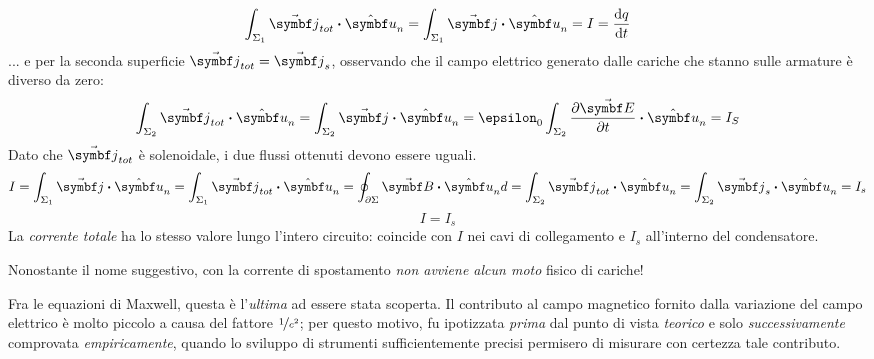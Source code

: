 \begin{equation*}
	\int_{\Sigma_1}\vba{j}_{tot}\vdot\vbh{u}_n=\int_{\Sigma_1}\vba{j}\vdot\vbh{u}_n=I=\dv{q}{t}
\end{equation*}
... e per la seconda superficie $\vba{j}_{tot}=\vba{j}_s$, osservando che il campo elettrico generato dalle cariche che stanno sulle armature è diverso da zero:
\begin{equation*}
	\int_{\Sigma_2}\vba{j}_{tot}\vdot\vbh{u}_n=\int_{\Sigma_2}\vba{j}\vdot\vbh{u}_n=\epsilon_0\int_{\Sigma_2}\pdv{\vba{E}}{t}\vdot\vbh{u}_n=I_S
\end{equation*}
Dato che $\vba{j}_{tot}$ è solenoidale, i due flussi ottenuti devono essere uguali.
\begin{equation*}
	I=\int_{\Sigma_1}\vba{j}\vdot\vbh{u}_n=\int_{\Sigma_1}\vba{j}_{tot}\vdot\vbh{u}_n=\oint_{\partial \Sigma}\vba{B}\vdot\vbh{u}_nd=\int_{\Sigma_2}\vba{j}_{tot}\vdot\vbh{u}_n=\int_{\Sigma_2}\vba{j}_{s}\vdot\vbh{u}_n=I_s
\end{equation*}
\begin{equation}
	I=I_s
\end{equation}
La \textit{corrente totale} ha lo stesso valore lungo l'intero circuito: coincide con $I$ nei cavi di collegamento e $I_s$ all'interno del condensatore.
\begin{attention}
	Nonostante il nome suggestivo, con la corrente di spostamento \textit{non avviene alcun moto} fisico di cariche!
\end{attention}
\begin{digression}
	Fra le equazioni di Maxwell, questa è l'\textit{ultima} ad essere stata scoperta. Il contributo al campo magnetico fornito dalla variazione del campo elettrico è molto piccolo a causa del fattore $\nicefrac{1}{c^2}$; per questo motivo, fu ipotizzata \textit{prima} dal punto di vista \textit{teorico} e solo \textit{successivamente}  comprovata \textit{empiricamente}, quando lo sviluppo di strumenti sufficientemente precisi permisero di misurare con certezza tale contributo.
\end{digression}
